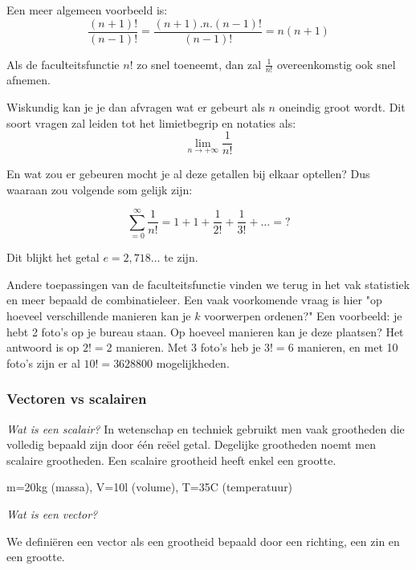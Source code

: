 \begin{voorbeeld}
Een meer algemeen voorbeeld is:
\begin{equation*}
\frac{(n+1)!}{(n-1)!}=\frac{(n+1).n.(n-1)!}{(n-1)!}=n(n+1)
\end{equation*}
\end{voorbeeld}

Als de faculteitsfunctie $n!$ zo snel toeneemt, dan zal $\frac{1}{n!}$ overeenkomstig ook snel afnemen.

Wiskundig kan je je dan afvragen wat er gebeurt als $n$ oneindig groot wordt. Dit soort vragen zal leiden tot het limietbegrip en notaties als:
\begin{equation*}
\lim\limits_{n \to +\infty} \frac{1}{n!}
\end{equation*}

En wat zou er gebeuren mocht je al deze getallen bij elkaar optellen? Dus waaraan zou volgende som gelijk zijn:

\begin{equation*}
\sum_{=0}^{\infty} \frac{1}{n!} = 1+1+\frac{1}{2!}+\frac{1}{3!}+\ldots=?
\end{equation*}

Dit blijkt het getal $e=2,718\ldots$ te zijn.

Andere toepassingen van de faculteitsfunctie vinden we terug in het vak statistiek en meer bepaald de combinatieleer. Een vaak voorkomende vraag is hier "op hoeveel verschillende manieren kan je $k$ voorwerpen ordenen?" Een voorbeeld: je hebt 2 foto's op je bureau staan. Op hoeveel manieren kan je deze plaatsen? Het antwoord is op $2!=2$ manieren. Met 3 foto's heb je $3!=6$ manieren, en met 10 foto's zijn er al $10!=3628800$ mogelijkheden.

\subsubsection{Vectoren vs scalairen}
\emph{Wat is een scalair?}
In wetenschap en techniek gebruikt men vaak grootheden die volledig bepaald zijn door \'e\'en re\"eel getal. Degelijke grootheden noemt men scalaire grootheden. Een scalaire grootheid heeft enkel een grootte.

\begin{voorbeeld}
m=20kg (massa), V=10l (volume), T=35\textdegree C (temperatuur)
\end{voorbeeld}

\emph{Wat is een vector?}

\begin{definitie}
	We defini\"eren een vector als een grootheid bepaald door een richting, een zin en een grootte.
\end{definitie}

